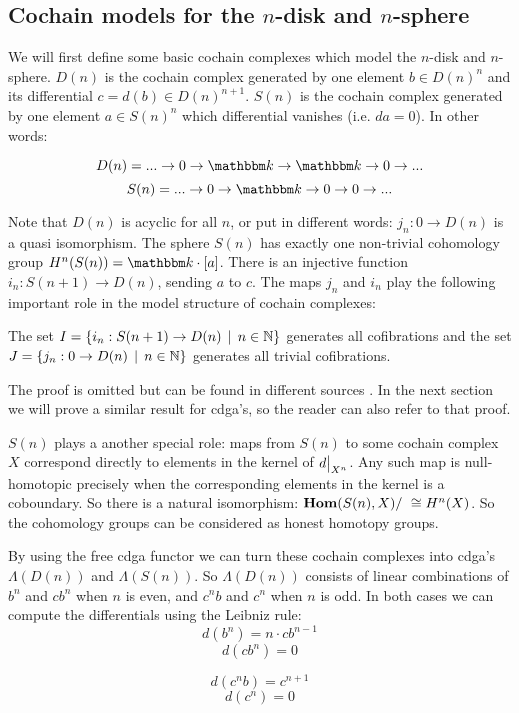 
\subsection{Cochain models for the $n$-disk and $n$-sphere}
We will first define some basic cochain complexes which model the $n$-disk and $n$-sphere. $D(n)$ is the cochain complex generated by one element $b \in D(n)^n$ and its differential $c = d(b) \in D(n)^{n+1}$. $S(n)$ is the cochain complex generated by one element $a \in S(n)^n$ which differential vanishes (i.e. $da = 0$). In other words:

$$ D(n) = ... \to 0 \to \k \to \k \to 0 \to ... $$
$$ S(n) = ... \to 0 \to \k \to 0 \to 0 \to ... $$

Note that $D(n)$ is acyclic for all $n$, or put in different words: $j_n : 0 \to D(n)$ is a quasi isomorphism. The sphere $S(n)$ has exactly one non-trivial cohomology group $H^n(S(n)) = \k \cdot [a]$. There is an injective function $i_n : S(n+1) \to D(n)$, sending $a$ to $c$. The maps $j_n$ and $i_n$ play the following important role in the model structure of cochain complexes:

\begin{claim}
	The set $I = \{i_n : S(n+1) \to D(n) \,\mid\, n \in \mathbb{N}\}$ generates all cofibrations and the set $J = \{j_n : 0 \to D(n) \,\mid\, n \in \mathbb{N}\}$ generates all trivial cofibrations.
\end{claim}

The proof is omitted but can be found in different sources . In the next section we will prove a similar result for cdga's, so the reader can also refer to that proof.

$S(n)$ plays a another special role: maps from $S(n)$ to some cochain complex $X$ correspond directly to elements in the kernel of $\restr{d}{X^n}$. Any such map is null-homotopic precisely when the corresponding elements in the kernel is a coboundary. So there is a natural isomorphism: $\mathbf{Hom}(S(n), X) / ~ \cong H^n(X)$. So the cohomology groups can be considered as honest homotopy groups.

By using the free cdga functor we can turn these cochain complexes into cdga's $\Lambda(D(n))$ and $\Lambda(S(n))$. So $\Lambda(D(n))$ consists of linear combinations of $b^n$ and $c b^n$ when $n$ is even, and $c^n b$ and $c^n$ when $n$ is odd. In both cases we can compute the differentials using the Leibniz rule:
$$ d(b^n) = n \cdot c b^{n-1} $$
$$ d(c b^n) = 0 $$

$$ d(c^n b) = c^{n+1} $$
$$ d(c^n) = 0 $$

